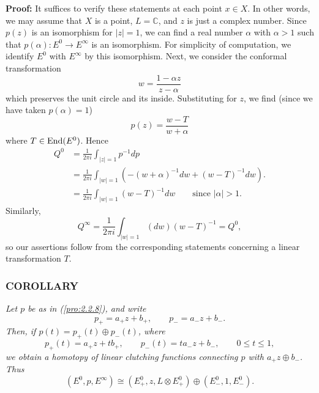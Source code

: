 \textbf{Proof:} It suffices to verify these statements at each point $x \in X$. In other words, we may assume that $X$ is a point, $L = \mathbb{C}$, and $z$ is just a complex number. Since $p(z)$ is an isomorphism for $|z| = 1$, we can find a real number $\alpha$ with $\alpha > 1$ such that $p(\alpha): E^0 \to E^\infty$ is an isomorphism. For simplicity of computation, we identify $E^0$ with $E^\infty$ by this isomorphism. Next, we consider the conformal transformation
\begin{equation*}
    w = \frac{1 - \alpha z}{z - \alpha}
\end{equation*}
which preserves the unit circle and its inside. Substituting for $z$, we find (since we have taken $p(\alpha) = 1$)
\begin{equation*}
    p(z) = \frac{w - T}{w + \alpha}
\end{equation*}
where $T \in \operatorname{End}(E^0)$. Hence
\begin{align*}
    Q^0 &= \frac{1}{2 \pi i} \int_{|z| = 1} p^{-1} dp \\
    &= \frac{1}{2 \pi i} \int_{|w| = 1} (-(w + \alpha)^{-1} dw + (w - T)^{-1} dw) .\\
    &= \frac{1}{2 \pi i} \int_{|w| = 1} (w - T)^{-1} dw \qquad \text{since } |\alpha| > 1.
\end{align*}
Similarly,
\begin{equation*}
    Q^\infty = \frac{1}{2 \pi i} \int_{|w| = 1} (dw)(w - T)^{-1} = Q^0,
\end{equation*}
so our assertions follow from the corresponding statements concerning a linear transformation $T$.

\subsubsection{COROLLARY}\label{cor:2.2.9} \textit{Let $p$ be as in (\ref{pro:2.2.8}), and write}
\begin{equation*}
    p_+ = a_+ z + b_+, \qquad p_- = a_- z + b_- .
\end{equation*}
\textit{Then, if $p(t) = p_+(t) \oplus p_-(t)$, where}
\begin{equation*}
    p_+(t) = a_+ z + tb_+, \qquad p_-(t) = ta_- z + b_-, \qquad 0 \leq t \leq 1,
\end{equation*}
\textit{we obtain a homotopy of linear clutching functions connecting $p$ with $a_+ z \oplus b_-$. Thus}
\begin{equation*}
    (E^0, p, E^\infty) \cong (E^0_+, z, L \otimes E^0_+) \oplus (E^0_-, 1, E^0_-) .
\end{equation*}

